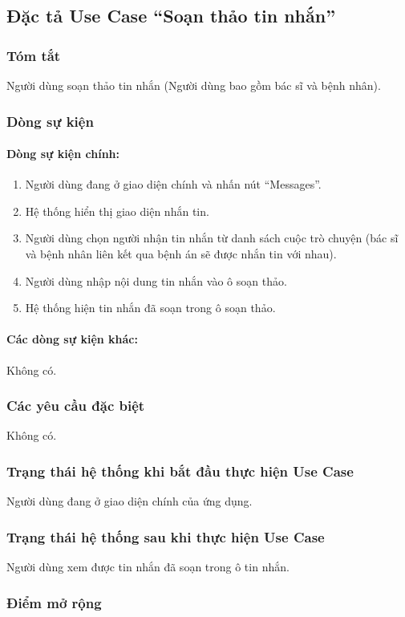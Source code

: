 \subsection{Đặc tả Use Case ``Soạn thảo tin nhắn''}

\subsubsection{Tóm tắt}
Người dùng soạn thảo tin nhắn (Người dùng bao gồm bác sĩ và bệnh nhân).

\subsubsection{Dòng sự kiện}
\paragraph{\textbf{Dòng sự kiện chính:}}
\begin{enumerate}
  \item Người dùng đang ở giao diện chính và nhấn nút ``Messages''.
  \item Hệ thống hiển thị giao diện nhắn tin.
  \item Người dùng chọn người nhận tin nhắn từ danh sách cuộc trò chuyện (bác sĩ và bệnh nhân liên kết qua bệnh án sẽ được nhắn tin với nhau).
  \item Người dùng nhập nội dung tin nhắn vào ô soạn thảo.
  \item Hệ thống hiện tin nhắn đã soạn trong ô soạn thảo.
\end{enumerate}

\paragraph{\textbf{Các dòng sự kiện khác:}}
Không có.

\subsubsection{Các yêu cầu đặc biệt}
Không có.

\subsubsection{Trạng thái hệ thống khi bắt đầu thực hiện Use Case}
Người dùng đang ở giao diện chính của ứng dụng.

\subsubsection{Trạng thái hệ thống sau khi thực hiện Use Case}
Người dùng xem được tin nhắn đã soạn trong ô tin nhắn.

\subsubsection{Điểm mở rộng}
